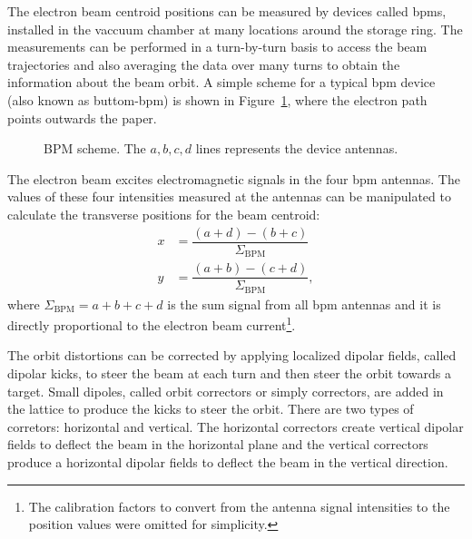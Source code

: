 The electron beam centroid positions can be measured by devices called \glspl{bpm}, installed in the vaccuum chamber at many locations around the storage ring. The measurements can be performed in a turn-by-turn basis to access the beam trajectories and also averaging the data over many turns to obtain the information about the beam orbit. A simple scheme for a typical \gls{bpm} device (also known as buttom-\gls{bpm}) is shown in Figure~\ref{fig:bpm_scheme}, where the electron path points outwards the paper.
\begin{figure}
    \centering
    \caption{BPM scheme. The $a, b, c, d$ lines represents the device antennas.}
    \label{fig:bpm_scheme}
\end{figure}

The electron beam excites electromagnetic signals in the four \gls{bpm} antennas. The values of these four intensities measured at the antennas can be manipulated to calculate the transverse positions for the beam centroid:
\begin{align}
    x &= \dfrac{\left(a + d\right) - \left(b + c\right)}{\Sigma_{\mathrm{BPM}}} \\
    y &= \dfrac{\left(a + b\right) - \left(c + d\right)}{\Sigma_{\mathrm{BPM}}},
\end{align}
where $\Sigma_{\mathrm{BPM}} = a + b + c + d$ is the sum signal from all \gls{bpm} antennas and it is directly proportional to the electron beam current\footnote{The calibration factors to convert from the antenna signal intensities to the position values were omitted for simplicity.}. 

The orbit distortions can be corrected by applying localized dipolar fields, called dipolar kicks, to steer the beam at each turn and then steer the orbit towards a target. Small dipoles, called orbit correctors or simply correctors, are added in the lattice to produce the kicks to steer the orbit. There are two types of corretors: horizontal and vertical. The horizontal correctors create vertical dipolar fields to deflect the beam in the horizontal plane and the vertical correctors produce a horizontal dipolar fields to deflect the beam in the vertical direction. 

